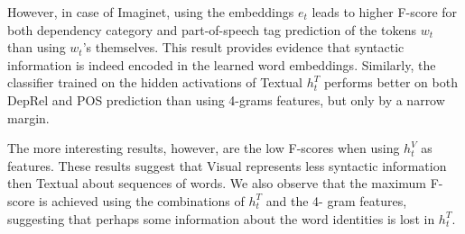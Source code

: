 However, in case of {\sc Imaginet}, using the embeddings $e_t$ leads to higher F-score for both dependency category and part-of-speech tag prediction of the tokens $w_t$ than using $w_{t}$'s 
themselves. This result provides evidence that syntactic information is indeed encoded in the learned word embeddings. 
Similarly, the classifier trained on the hidden activations of {\sc Textual } $h_t^T$ 
performs better on both DepRel and POS prediction than using 4-grams features, but only by a 
narrow margin. 

The more interesting results, however, are the low F-scores when 
using $h_{t}^V$ as features. These results suggest that {\sc Visual} represents less 
syntactic information then {\sc Textual} about sequences of words. We also observe 
that the maximum F-score is achieved using the combinations of $h_{t}^T$ and the 4-
gram features, suggesting that perhaps some information about the word identities is 
lost in $h_{t}^T$.
